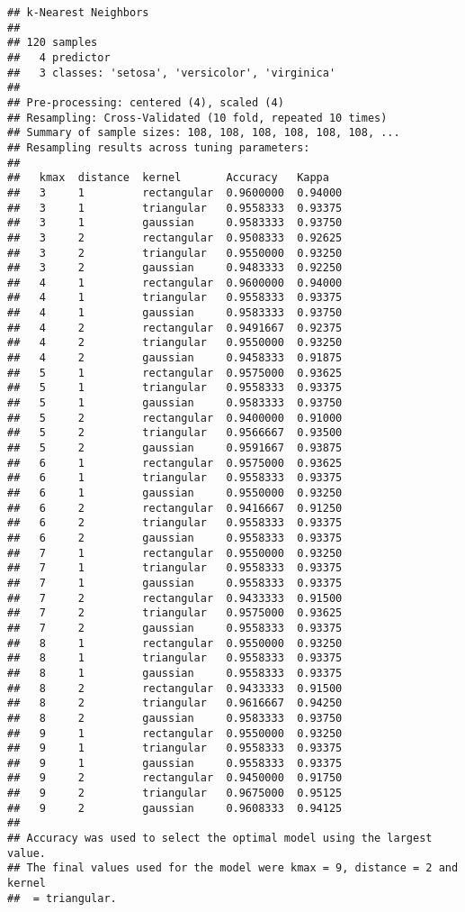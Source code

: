 \documentclass[]{book}
\begin{document}
\begin{verbatim}
## k-Nearest Neighbors 
## 
## 120 samples
##   4 predictor
##   3 classes: 'setosa', 'versicolor', 'virginica' 
## 
## Pre-processing: centered (4), scaled (4) 
## Resampling: Cross-Validated (10 fold, repeated 10 times) 
## Summary of sample sizes: 108, 108, 108, 108, 108, 108, ... 
## Resampling results across tuning parameters:
## 
##   kmax  distance  kernel       Accuracy   Kappa  
##   3     1         rectangular  0.9600000  0.94000
##   3     1         triangular   0.9558333  0.93375
##   3     1         gaussian     0.9583333  0.93750
##   3     2         rectangular  0.9508333  0.92625
##   3     2         triangular   0.9550000  0.93250
##   3     2         gaussian     0.9483333  0.92250
##   4     1         rectangular  0.9600000  0.94000
##   4     1         triangular   0.9558333  0.93375
##   4     1         gaussian     0.9583333  0.93750
##   4     2         rectangular  0.9491667  0.92375
##   4     2         triangular   0.9550000  0.93250
##   4     2         gaussian     0.9458333  0.91875
##   5     1         rectangular  0.9575000  0.93625
##   5     1         triangular   0.9558333  0.93375
##   5     1         gaussian     0.9583333  0.93750
##   5     2         rectangular  0.9400000  0.91000
##   5     2         triangular   0.9566667  0.93500
##   5     2         gaussian     0.9591667  0.93875
##   6     1         rectangular  0.9575000  0.93625
##   6     1         triangular   0.9558333  0.93375
##   6     1         gaussian     0.9550000  0.93250
##   6     2         rectangular  0.9416667  0.91250
##   6     2         triangular   0.9558333  0.93375
##   6     2         gaussian     0.9558333  0.93375
##   7     1         rectangular  0.9550000  0.93250
##   7     1         triangular   0.9558333  0.93375
##   7     1         gaussian     0.9558333  0.93375
##   7     2         rectangular  0.9433333  0.91500
##   7     2         triangular   0.9575000  0.93625
##   7     2         gaussian     0.9558333  0.93375
##   8     1         rectangular  0.9550000  0.93250
##   8     1         triangular   0.9558333  0.93375
##   8     1         gaussian     0.9558333  0.93375
##   8     2         rectangular  0.9433333  0.91500
##   8     2         triangular   0.9616667  0.94250
##   8     2         gaussian     0.9583333  0.93750
##   9     1         rectangular  0.9550000  0.93250
##   9     1         triangular   0.9558333  0.93375
##   9     1         gaussian     0.9558333  0.93375
##   9     2         rectangular  0.9450000  0.91750
##   9     2         triangular   0.9675000  0.95125
##   9     2         gaussian     0.9608333  0.94125
## 
## Accuracy was used to select the optimal model using the largest value.
## The final values used for the model were kmax = 9, distance = 2 and kernel
##  = triangular.
\end{verbatim}
\end{document}
